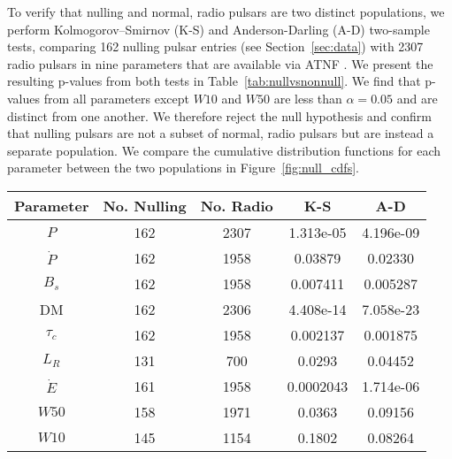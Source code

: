 \documentclass[fleqn,usenatbib]{mnras}
\begin{document}
To verify that nulling and normal, radio pulsars are two distinct populations, we perform Kolmogorov–Smirnov (K-S) and Anderson-Darling (A-D) two-sample tests, comparing 162 nulling pulsar entries (see Section~\ref{sec:data}) with 2307 radio pulsars in nine parameters that are available via ATNF \citep{Manchester_2005}. We present the resulting p-values from both tests in Table~\ref{tab:nullvsnonnull}. We find that p-values from all parameters except $W10$ and $W50$ are less than $\alpha = 0.05$ and are distinct from one another. We therefore  reject the null hypothesis and confirm that nulling pulsars are not a subset of normal, radio pulsars but are instead a separate population.  We compare the cumulative distribution functions for each parameter between the two populations in Figure~\ref{fig:null_cdfs}.

\begin{table*} 
\centering
\begin{tabular*}{0.45\linewidth}{ccccc}
\hline
\hline
Parameter & No. Nulling   & No. Radio   & K-S & A-D \\
\hline
    $P$         & 162  & 2307  & 1.313e-05   & 4.196e-09 \\
    $\dot{P}$   & 162  & 1958  & 0.03879   & 0.02330 \\
    $B_s$       & 162  & 1958  & 0.007411   & 0.005287 \\
    DM          & 162  & 2306  & 4.408e-14  & 7.058e-23 \\
    $\tau_c$    & 162  & 1958  & 0.002137   & 0.001875 \\
    $L_R$       & 131  & 700   & 0.0293   & 0.04452 \\
    $\dot{E}$   & 161  & 1958  & 0.0002043   & 1.714e-06 \\
    $W50$       & 158  & 1971  & 0.0363   & 0.09156 \\
    $W10$       & 145  & 1154  & 0.1802   & 0.08264 \\ 
\hline
\end{tabular*}
\caption{Resulting p-values from Kolmogorov–Smirnov (K-S) and Anderson-Darling (A-D) two-sample tests. Here,  $P$ is spin period, $\dot{P}$ is spin-down rate, $B_s$ is the surface magnetic field strength, DM is the dispersion measure,    $\tau_c$ is characteristic age,  $L_R$ is the radio luminosity at 400 MHz, $\dot{E}$ is the spin-down luminosity, $W50$ is the pulse width at 50\% peak brightness,  and $W10$ is the pulse width at 10\% brightness. Given our small p-values, we reject the null hypothesis that these two samples are from the same population, even though we cannot claim they are distinct in $W10$ or $W50$. We instead conclude that nulling pulsars are not a subset of radio pulsars and are a distinct and separate population. See Figure \ref{fig:null_cdfs} for the cumulative distribution functions of the two populations in all nine parameters.}
\label{tab:nullvsnonnull}
\end{table*}
\end{document}
